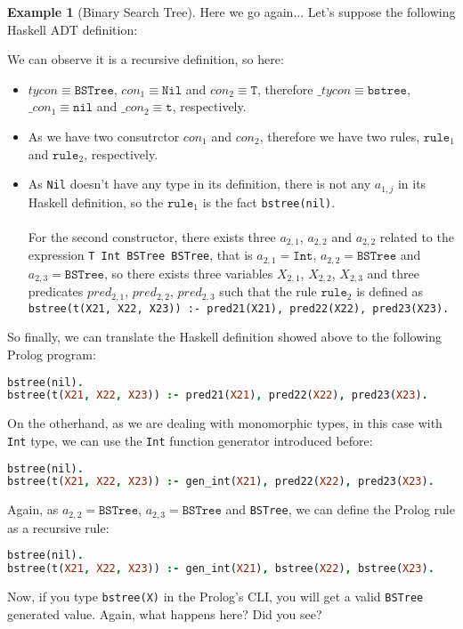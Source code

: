 \documentclass{report}
\theoremstyle{definition}
\newtheorem{example}{Example}[section]
\theoremstyle{definition}
\newcommand{\ttt}[1]{\texttt{#1}}
\begin{document}
\begin{example}[Binary Search Tree]
	Here we go again... Let's suppose the following Haskell ADT definition:
	
	We can observe it is a recursive definition, so here:
	\begin{itemize}
		\item $tycon \equiv \ttt{BSTree}$, $con_1 \equiv \ttt{Nil}$ and $con_2 \equiv \ttt{T}$, therefore $\_tycon \equiv \ttt{bstree}$, $\_con_1 \equiv \ttt{nil}$ and $\_con_2 \equiv \ttt{t}$, respectively.
		\item As we have two consutrctor $con_1$ and $con_2$, therefore we have two rules, $\ttt{rule}_1$ and $\ttt{rule}_2$, respectively.
		\item As \ttt{Nil} doesn't have any type in its definition, there is not any $a_{1,j}$ in its Haskell definition, so the $\ttt{rule}_1$ is the fact \ttt{bstree(nil)}.\\\\
		For the second constructor, there exists three $a_{2,1}$, $a_{2,2}$ and $a_{2,2}$ related to the expression \ttt{T Int BSTree BSTree}, that is $a_{2,1} = \ttt{Int}$, $a_{2,2} = \ttt{BSTree}$ and $a_{2,3} = \ttt{BSTree}$, so there exists three variables $X_{2,1}$, $X_{2,2}$, $X_{2,3}$ and three predicates $pred_{2,1}$, $pred_{2,2}$, $pred_{2,3}$ such that the rule $\ttt{rule}_2$ is defined as \\ \ttt{bstree(t(X21, X22, X23)) :- pred21(X21), pred22(X22), pred23(X23).}
	\end{itemize}
	So finally, we can translate the Haskell definition showed above to the following Prolog program:\\
\begin{lstlisting}[language=Prolog]
bstree(nil).																														%% rule 1
bstree(t(X21, X22, X23)) :- pred21(X21), pred22(X22), pred23(X23).			%% rule 2
\end{lstlisting}
On the otherhand, as we are dealing with monomorphic types, in this case with \ttt{Int} type, we can use the \ttt{Int} function generator introduced before:\\
\begin{lstlisting}[language=Prolog]
bstree(nil).																														%% rule 1
bstree(t(X21, X22, X23)) :- gen_int(X21), pred22(X22), pred23(X23).			%% rule 2
\end{lstlisting}
Again, as $a_{2,2} = \ttt{BSTree}$, $a_{2,3} = \ttt{BSTree}$ and \ttt{BSTree}, we can define the Prolog rule as a recursive rule:\\
\begin{lstlisting}[language=Prolog]
bstree(nil).																														%% rule 1
bstree(t(X21, X22, X23)) :- gen_int(X21), bstree(X22), bstree(X23).			%% rule 2
\end{lstlisting}
Now, if you type \ttt{bstree(X)} in the Prolog's CLI, you will get a valid \ttt{BSTree} generated value. Again, what happens here? Did you see?
\end{example}
\end{document}
